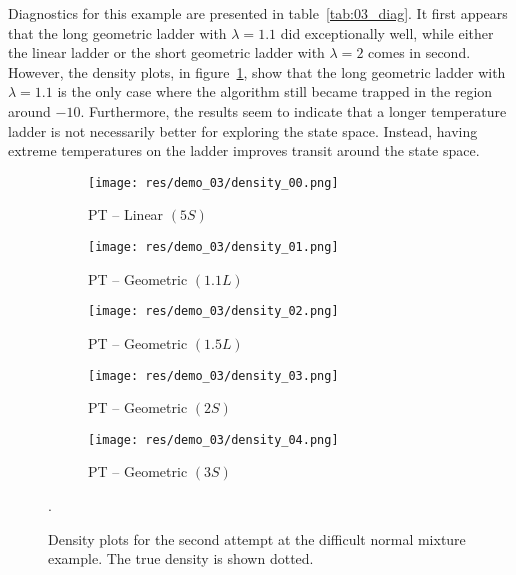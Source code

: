 Diagnostics for this example are presented in table~\ref{tab:03_diag}.
It first appears that the long geometric ladder with $\lambda = 1.1$ did
exceptionally well, while either the linear ladder or the short geometric
ladder with $\lambda = 2$ comes in second.
However, the density plots, in figure~\ref{fig:03_density}, show that the
long geometric ladder with $\lambda = 1.1$ is the only case where the
algorithm still became trapped in the region around $-10$.
Furthermore, the results seem to indicate that a longer temperature ladder
is not necessarily better for exploring the state space.
Instead, having extreme temperatures on the ladder improves transit around
the state space.

    \begin{figure}[h]
    \begin{subfigure}[b]{0.3\textwidth}
        \texttt{[image: res/demo\_03/density\_00.png]}
        \caption{PT -- Linear $(5S)$}
    \end{subfigure}
    \begin{subfigure}[b]{0.3\textwidth}
        \texttt{[image: res/demo\_03/density\_01.png]}
        \caption{PT -- Geometric $(1.1L)$}
    \end{subfigure}
    \begin{subfigure}[b]{0.3\textwidth}
        \texttt{[image: res/demo\_03/density\_02.png]}
        \caption{PT -- Geometric $(1.5L)$}
    \end{subfigure}
    \begin{subfigure}[b]{0.3\textwidth}
        \texttt{[image: res/demo\_03/density\_03.png]}
        \caption{PT -- Geometric $(2S)$}
    \end{subfigure}
    \begin{subfigure}[b]{0.3\textwidth}
        \texttt{[image: res/demo\_03/density\_04.png]}
        \caption{PT -- Geometric $(3S)$}
    \end{subfigure}
    \caption{
    Density plots for the second attempt at the difficult normal mixture 
    example.
    The true density is shown dotted.
    }
    \label{fig:03_density}.
    \end{figure}

\FloatBlock
